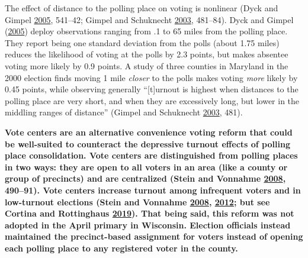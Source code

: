 \documentclass[
  12pt,
]{article}
\begin{document}
The effect of distance to the polling place on voting is nonlinear (Dyck and Gimpel \protect\hyperlink{ref-Dyck2005}{2005}, 541--42; Gimpel and Schuknecht \protect\hyperlink{ref-Gimpel2003}{2003}, 481--84). Dyck and Gimpel (\protect\hyperlink{ref-Dyck2005}{2005}) deploy observations ranging from .1 to 65 miles from the polling place. They report being one standard deviation from the polls (about 1.75 miles) reduces the likelihood of voting at the polls by 2.3 points, but makes absentee voting more likely by 0.9 points. A study of three counties in Maryland in the 2000 election finds moving 1 mile \emph{closer} to the polls makes voting \emph{more} likely by 0.45 points, while observing generally ``{[}t{]}urnout is highest when distances to the polling place are very short, and when they are excessively long, but lower in the middling ranges of distance'' (Gimpel and Schuknecht \protect\hyperlink{ref-Gimpel2003}{2003}, 481).

\textbf{Vote centers are an alternative convenience voting reform that could be well-suited to counteract the depressive turnout effects of polling place consolidation. Vote centers are distinguished from polling places in two ways: they are open to all voters in an area (like a county or group of precincts) and are centralized (Stein and Vonnahme \protect\hyperlink{ref-Stein2008}{2008}, 490--91). Vote centers increase turnout among infrequent voters and in low-turnout elections (Stein and Vonnahme \protect\hyperlink{ref-Stein2008}{2008}, \protect\hyperlink{ref-Stein2012}{2012}; but see Cortina and Rottinghaus \protect\hyperlink{ref-Cortina2019}{2019}). That being said, this reform was not adopted in the April primary in Wisconsin. Election officials instead maintained the precinct-based assignment for voters instead of opening each polling place to any registered voter in the county.}
\end{document}
